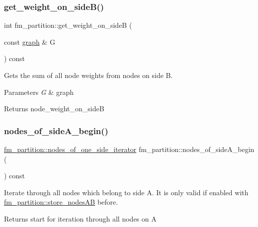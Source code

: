 \subsubsection{\texorpdfstring{get\+\_\+weight\+\_\+on\+\_\+side\+B()}{get\_weight\_on\_sideB()}}
{\footnotesize\ttfamily int fm\+\_\+partition\+::get\+\_\+weight\+\_\+on\+\_\+sideB (\begin{DoxyParamCaption}\item[{const \mbox{\hyperlink{classgraph}{graph}} \&}]{G }\end{DoxyParamCaption}) const}

Gets the sum of all node weights from nodes on side B.


\begin{DoxyParams}{Parameters}
{\em G} & graph \\
\hline
\end{DoxyParams}
\begin{DoxyReturn}{Returns}
{\ttfamily node\+\_\+weight\+\_\+on\+\_\+sideB} 
\end{DoxyReturn}
\mbox{\label{classfm__partition_adad3bf33efb4a2b1b0feadeafb33f5fd}} 
\subsubsection{\texorpdfstring{nodes\+\_\+of\+\_\+side\+A\+\_\+begin()}{nodes\_of\_sideA\_begin()}}
{\footnotesize\ttfamily \mbox{\hyperlink{classfm__partition_ac8b7b5253476118e5f7bbad2fe8af285}{fm\+\_\+partition\+::nodes\+\_\+of\+\_\+one\+\_\+side\+\_\+iterator}} fm\+\_\+partition\+::nodes\+\_\+of\+\_\+side\+A\+\_\+begin (\begin{DoxyParamCaption}{ }\end{DoxyParamCaption}) const}

Iterate through all nodes which belong to side {\ttfamily A}. It is only valid if enabled with \mbox{\hyperlink{classfm__partition_a8926005b4637055d2acf6f29ad2d9b97}{fm\+\_\+partition\+::store\+\_\+nodes\+AB}} before.

\begin{DoxyReturn}{Returns}
start for iteration through all nodes on {\ttfamily A} 
\end{DoxyReturn}
\mbox{\label{classfm__partition_ac4202d1d929c1700985ad5d452b735fb}} 
